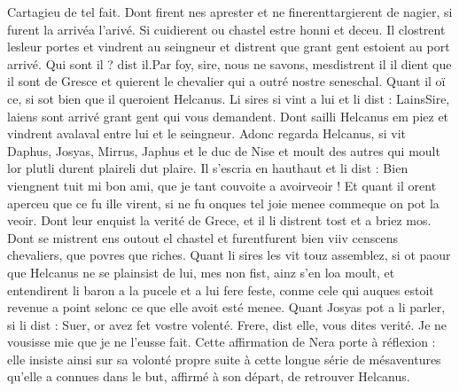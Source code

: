 \documentclass{article}
\begin{document}
\begin{pages}
               Cartagieu de tel fait. 
               Dont firent nes aprester et ne finerenttargierent 
               de nagier, si furent 
               la arrivéa l'arivé. 
               Si cuidierent ou chastel estre honni 
               et deceu. 
               Il clostrent lesleur portes 
               et vindrent au seingneur et 
               distrent que grant gent estoient au port arrivé. 
               Qui sont il ? dist il.Par foy, sire,
                  nous ne savons, mesdistrent il 
                  il dient que il sont de Gresce 
               et quierent le chevalier qui a outré nostre 
                  seneschal.
               Quant il oï ce, si sot bien que il queroient Helcanus. 
               Li sires 
               si vint a lui et li dist :
               LainsSire, laiens 
                  sont arrivé grant gent qui vous demandent.
               Dont sailli Helcanus em piez et vindrent 
               avalaval entre lui et le 
               seingneur. 
               Adonc regarda Helcanus, si vit 
               Daphus, Josyas, Mirrus, 
               Japhus et le duc de Nise 
               et moult des autres qui moult 
               lor plutli durent plaireli dut plaire. 
               Il s’escria en hauthaut et li dist :
               Bien viengnent tuit mi bon ami, que je tant couvoite a 
                  avoirveoir ! 
               Et quant il orent aperceu que ce fu ille virent, 
               si ne fu onques tel joie menee commeque on pot la veoir. 
               Dont leur enquist la verité de Grece, 
               et il li distrent tost et a briez mos. 
               Dont se mistrent ens outout el 
               chastel et 
               furentfurent bien 
               viiv 
               censcens chevaliers, que povres que riches. \pend
            \pstart Quant li sires les vit touz assemblez, 
               si ot paour que Helcanus ne se plainsist de lui, 
               mes non fist, ainz s’en loa moult, et entendirent li baron a la pucele et a lui fere feste, 
               conme cele qui auques estoit revenue a point selonc ce que elle avoit esté menee. 
               Quant Josyas pot a li parler, si li dist :
               Suer, or avez fet vostre volenté. Frere, dist elle, vous dites verité. Je ne vousisse mie 
                  que je ne l’eusse fait. 
               Cette affirmation de Nera porte à réflexion : elle insiste ainsi sur sa volonté propre
               suite à cette longue série de mésaventures qu'elle a connues dans le but, affirmé à son départ, de retrouver Helcanus. 

\end{pages}
\end{document}

